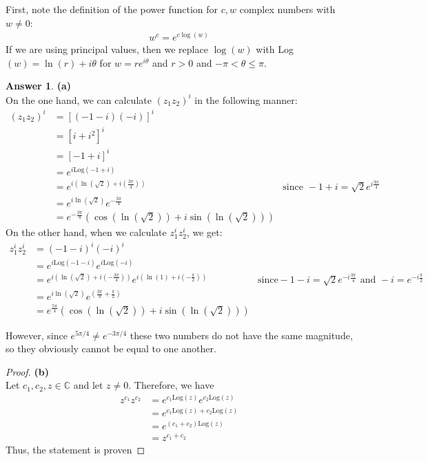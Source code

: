 \documentclass[10pt,a4paper]{article}
\theoremstyle{definition}
\newtheorem*{answer*}{Answer}
\begin{document}
First, note the definition of the power function for $c, w$ complex numbers with $w \neq 0$:
\begin{align*}
w^c = e^{c \log(w)}
\end{align*}
If we are using principal values, then we replace $\log(w)$ with Log$(w) = \ln(r) + i\theta$ for $w = re^{i\theta}$ and $r > 0$ and $-\pi < \theta \leq \pi$.
\begin{answer*}{\textbf{(a)}}
\\On the one hand, we can calculate $(z_1z_2)^i$ in the following manner:
\begin{align*}
(z_1z_2)^i &= \left[(-1-i)(-i)\right]^i\\
&= \left[i + i^2\right]^i\\
&= [-1 + i]^i\\
&= e^{\displaystyle i\text{Log}(-1 + i)}\\
&= e^{\displaystyle i\left(\ln(\sqrt{2}) + i\left(\frac{3\pi}{4}\right)\right)} &\text{since } -1 + i = \sqrt{2}e^{\displaystyle i \frac{3 \pi}{4}}\\
&= e^{\displaystyle i \ln(\sqrt{2})}e^{\displaystyle -\frac{3\pi}{4}}\\
&= e^{\displaystyle -\frac{3\pi}{4}}\left(\cos(\ln(\sqrt{2})) + i\sin(\ln(\sqrt{2}))\right)
\end{align*}
On the other hand, when we calculate $z_1^iz_2^i$, we get:
\begin{align*}
z_1^iz_2^i &= (-1-i)^i(-i)^i\\
&= e^{\displaystyle i \text{Log}(-1-i)}e^{\displaystyle i \text{Log}(-i)}\\
&= e^{\displaystyle i\left(\ln(\sqrt{2}) + i\left(-\frac{3\pi}{4}\right)\right)}e^{\displaystyle i\left(\ln(1) + i\left(-\frac{\pi}{2}\right)\right)} &\text{since} -1-i = \sqrt{2}e^{\displaystyle -i\frac{3\pi}{4}} \text{ and } -i = e^{\displaystyle -i \frac{\pi}{2}}\\
&= e^{\displaystyle i \ln(\sqrt{2})}e^{\displaystyle \left( \frac{3\pi}{4} + \frac{\pi}{2}\right)}\\
&= e^{\displaystyle \frac{5\pi}{4}}\left(\cos(\ln(\sqrt{2})) + i\sin(\ln(\sqrt{2}))\right)
\end{align*}

However, since $e^{5\pi / 4} \neq e^{-3\pi / 4}$ these two numbers do not have the same magnitude, so they obviously cannot be equal to one another. 
\end{answer*}

\begin{proof}{\textbf{(b)}}
\\Let $c_1, c_2, z \in \mathbb{C}$ and let $z \neq 0$. Therefore, we have
\begin{align*}
z^{c_1}z^{c_2} &= e^{c_1 \text{Log}(z)}e^{c_2 \text{Log}(z)}\\
&= e^{c_1 \text{Log}(z) + c_2 \text{Log}(z)}\\
&= e^{(c_1 + c_2)\text{Log}(z)}\\
&= z^{c_1 + c_2}
\end{align*}
Thus, the statement is proven
\end{proof}
\end{document}
